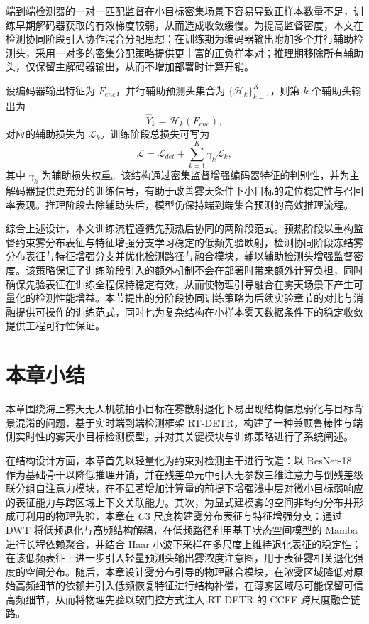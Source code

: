 端到端检测器的一对一匹配监督在小目标密集场景下容易导致正样本数量不足，训练早期解码器获取的有效梯度较弱，从而造成收敛缓慢。为提高监督密度，本文在检测协同阶段引入协作混合分配思想：在训练期为编码器输出附加多个并行辅助检测头，采用一对多的密集分配策略提供更丰富的正负样本对；推理期移除所有辅助头，仅保留主解码器输出，从而不增加部署时计算开销。

设编码器输出特征为 $F_{enc}$，并行辅助预测头集合为 $\{\mathcal{H}_k\}_{k=1}^{K}$，则第 $k$ 个辅助头输出为
\begin{equation}
\hat{Y}_k = \mathcal{H}_k(F_{enc}),
\end{equation}
对应的辅助损失为 $\mathcal{L}_k$。训练阶段总损失可写为
\begin{equation}
\mathcal{L} = \mathcal{L}_{det} + \sum_{k=1}^{K}\gamma_k \mathcal{L}_k,
\label{eq:total_hybrid_loss}
\end{equation}
其中 $\gamma_k$ 为辅助损失权重。该结构通过密集监督增强编码器特征的判别性，并为主解码器提供更充分的训练信号，有助于改善雾天条件下小目标的定位稳定性与召回率表现。推理阶段去除辅助头后，模型仍保持端到端集合预测的高效推理流程。

综合上述设计，本文训练流程遵循先预热后协同的两阶段范式。预热阶段以重构监督约束雾分布表征与特征增强分支学习稳定的低频先验映射，检测协同阶段冻结雾分布表征与特征增强分支并优化检测路径与融合模块，辅以辅助检测头增强监督密度。该策略保证了训练阶段引入的额外机制不会在部署时带来额外计算负担，同时确保先验表征在训练全程保持稳定有效，从而使物理引导融合在雾天场景下产生可量化的检测性能增益。本节提出的分阶段协同训练策略为后续实验章节的对比与消融提供可操作的训练范式，同时也为复杂结构在小样本雾天数据条件下的稳定收敛提供工程可行性保证。

\section{本章小结}
\label{sec:chap3_summary}

本章围绕海上雾天无人机航拍小目标在雾散射退化下易出现结构信息弱化与目标背景混淆的问题，基于实时端到端检测框架 RT-DETR，构建了一种兼顾鲁棒性与端侧实时性的雾天小目标检测模型，并对其关键模块与训练策略进行了系统阐述。

在结构设计方面，本章首先以轻量化为约束对检测主干进行改造：以 ResNet-18 作为基础骨干以降低推理开销，并在残差单元中引入无参数三维注意力与倒残差级联分组自注意力模块，在不显著增加计算量的前提下增强浅中层对微小目标弱响应的表征能力与跨区域上下文关联能力。其次，为显式建模雾的空间非均匀分布并形成可利用的物理先验，本章在 $C3$ 尺度构建雾分布表征与特征增强分支：通过 DWT 将低频退化与高频结构解耦，在低频路径利用基于状态空间模型的 Mamba 进行长程依赖聚合，并结合 Haar 小波下采样在多尺度上维持退化表征的稳定性；在该低频表征上进一步引入轻量预测头输出雾浓度注意图，用于表征雾相关退化强度的空间分布。随后，本章设计雾分布引导的物理融合模块，在浓雾区域降低对原始高频细节的依赖并引入低频恢复特征进行结构补偿，在薄雾区域尽可能保留可信高频细节，从而将物理先验以软门控方式注入 RT-DETR 的 CCFF 跨尺度融合链路。

